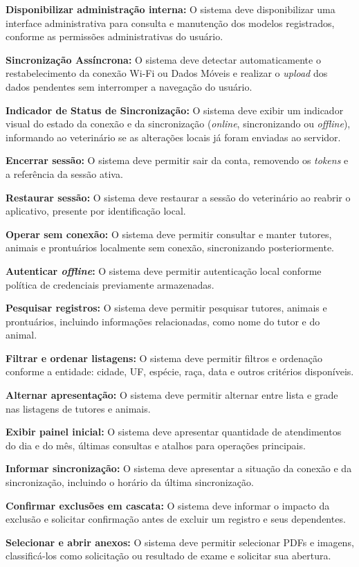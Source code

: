 \begin{description}[leftmargin=1.8cm, labelwidth=1.5cm, itemsep=0.5em]
    \item[RF19] \textbf{Disponibilizar administração interna:} O sistema deve disponibilizar uma interface administrativa para consulta e manutenção dos modelos registrados, conforme as permissões administrativas do usuário.
    \item[RF20] \textbf{Sincronização Assíncrona:} O sistema deve detectar automaticamente o restabelecimento da conexão Wi-Fi ou Dados Móveis e realizar o \textit{upload} dos dados pendentes sem interromper a navegação do usuário.
    \item[RF21] \textbf{Indicador de Status de Sincronização:} O sistema deve exibir um indicador visual do estado da conexão e da sincronização (\textit{online}, sincronizando ou \textit{offline}), informando ao veterinário se as alterações locais já foram enviadas ao servidor.
    \item[RF22] \textbf{Encerrar sessão:} O sistema deve permitir sair da conta, removendo os \textit{tokens} e a referência da sessão ativa.
    \item[RF23] \textbf{Restaurar sessão:} O sistema deve restaurar a sessão do veterinário ao reabrir o aplicativo, presente por identificação local.
    \item[RF24] \textbf{Operar sem conexão:} O sistema deve permitir consultar e manter tutores, animais e prontuários localmente sem conexão, sincronizando posteriormente.
    \item[RF25] \textbf{Autenticar \textit{offline}:} O sistema deve permitir autenticação local conforme política de credenciais previamente armazenadas.
    \item[RF26] \textbf{Pesquisar registros:} O sistema deve permitir pesquisar tutores, animais e prontuários, incluindo informações relacionadas, como nome do tutor e do animal.
    \item[RF27] \textbf{Filtrar e ordenar listagens:} O sistema deve permitir filtros e ordenação conforme a entidade: cidade, UF, espécie, raça, data e outros critérios disponíveis.
    \item[RF28] \textbf{Alternar apresentação:} O sistema deve permitir alternar entre lista e grade nas listagens de tutores e animais.
    \item[RF29] \textbf{Exibir painel inicial:} O sistema deve apresentar quantidade de atendimentos do dia e do mês, últimas consultas e atalhos para operações principais.
    \item[RF30] \textbf{Informar sincronização:} O sistema deve apresentar a situação da conexão e da sincronização, incluindo o horário da última sincronização.
    \item[RF31] \textbf{Confirmar exclusões em cascata:} O sistema deve informar o impacto da exclusão e solicitar confirmação antes de excluir um registro e seus dependentes.
    \item[RF32] \textbf{Selecionar e abrir anexos:} O sistema deve permitir selecionar PDFs e imagens, classificá-los como solicitação ou resultado de exame e solicitar sua abertura.
\end{description}

